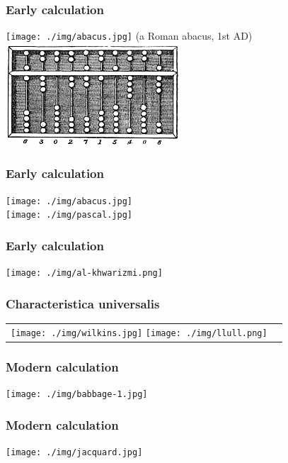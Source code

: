 \documentclass[11pt]{beamer}
\begin{document}
\begin{frame}[fragile]
  \frametitle{Early calculation}

  \texttt{[image: ./img/abacus.jpg]} (a Roman abacus, 1st AD)\\ \pause
  \includegraphics[height=0.35\textheight]{./img/Abacus_cn.png} \\
\end{frame}


\iffalse

\begin{frame}[fragile]
  \frametitle{Early calculation}
  \texttt{[image: ./img/abacus.jpg]} \\
  \texttt{[image: ./img/pascal.jpg]}
\end{frame}

\begin{frame}[fragile]
  \frametitle{Early calculation}

  \texttt{[image: ./img/al-khwarizmi.png]}
\end{frame}

\begin{frame}[fragile]
  \frametitle{Characteristica universalis}

  \begin{tabular}{cc}
  \texttt{[image: ./img/wilkins.jpg]}
  \texttt{[image: ./img/llull.png]}
  \end{tabular}
\end{frame}

\begin{frame}[fragile]
  \frametitle{Modern calculation}

  \texttt{[image: ./img/babbage-1.jpg]}
\end{frame}

\begin{frame}[fragile]
  \frametitle{Modern calculation}

  \texttt{[image: ./img/jacquard.jpg]}
\end{frame}
\end{document}
